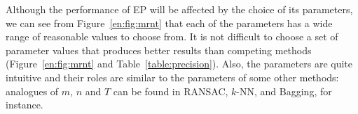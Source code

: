 Although the performance of EP will be affected by the choice of its
parameters, we can see from Figure~\ref{en:fig:mrnt} that each of the
parameters has a wide range of reasonable values to choose from. It is
not difficult to choose a set of parameter values that produces better
results than competing methods (\cf Figure~\ref{en:fig:mrnt} and
Table~\ref{table:precision}).  Also, the parameters are quite
intuitive and their roles are similar to the parameters of some
other methods: analogues of $m$, $n$ and $T$ can be found in
RANSAC, $k$-NN, and Bagging, for instance.



